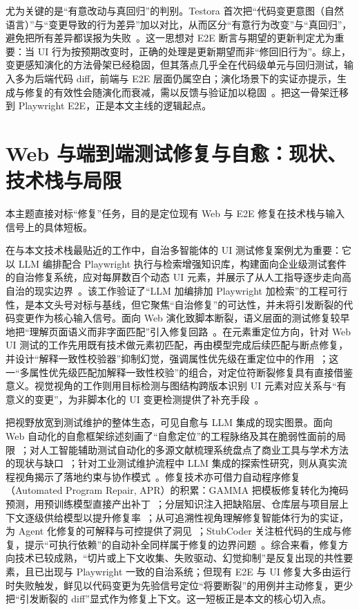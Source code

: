 \documentclass[11pt,a4paper]{article}
\begin{document}
尤为关键的是“有意改动与真回归”的判别。Testora 首次把“代码变更意图（自然语言）”与“变更导致的行为差异”加以对比，从而区分“有意行为改变”与“真回归”，避免把所有差异都误报为失败~\cite{testora}。这一思想对 E2E 断言与期望的更新判定尤为重要：当 UI 行为按预期改变时，正确的处理是更新期望而非“修回旧行为”。综上，变更感知演化的方法骨架已经稳固，但其落点几乎全在代码级单元与回归测试，输入多为后端代码 diff，前端与 E2E 层面仍属空白；演化场景下的实证亦提示，生成与修复的有效性会随演化而衰减，需以反馈与验证加以稳固~\cite{evalevolution}。把这一骨架迁移到 Playwright E2E，正是本文主线的逻辑起点。

\section{Web 与端到端测试修复与自愈：现状、技术栈与局限}

本主题直接对标“修复”任务，目的是定位现有 Web 与 E2E 修复在技术栈与输入信号上的具体短板。

在与本文技术栈最贴近的工作中，自治多智能体的 UI 测试修复案例尤为重要：它以 LLM 编排配合 Playwright 执行与检索增强知识库，构建面向企业级测试套件的自治修复系统，应对每屏数百个动态 UI 元素，并展示了从人工指导逐步走向高自治的现实边界~\cite{practicallimits}。该工作验证了“LLM 加编排加 Playwright 加检索”的工程可行性，是本文头号对标与基线，但它聚焦“自治修复”的可达性，并未将引发断裂的代码变更作为核心输入信号。面向 Web 演化致脚本断裂，语义层面的测试修复较早地把“理解页面语义而非字面匹配”引入修复回路~\cite{semantictestrepair}。在元素重定位方向，针对 Web UI 测试的工作先用既有技术做元素初匹配，再由模型完成后续匹配与断点修复，并设计“解释一致性校验器”抑制幻觉，强调属性优先级在重定位中的作用~\cite{fixwebui}；这一“多属性优先级匹配加解释一致性校验”的组合，对定位符断裂修复具有直接借鉴意义。视觉视角的工作则用目标检测与图结构跨版本识别 UI 元素对应关系与“有意义的变更”，为非脚本化的 UI 变更检测提供了补充手段~\cite{visualchange}。

把视野放宽到测试维护的整体生态，可见自愈与 LLM 集成的现实图景。面向 Web 自动化的自愈框架综述刻画了“自愈定位”的工程脉络及其在脆弱性面前的局限~\cite{selfhealingreview}；对人工智能辅助测试自动化的多源文献梳理系统盘点了商业工具与学术方法的现状与缺口~\cite{greyliterature}；针对工业测试维护流程中 LLM 集成的探索性研究，则从真实流程视角揭示了落地约束与协作模式~\cite{llmindustrialmaint}。修复技术亦可借力自动程序修复（Automated Program Repair, APR）的积累：GAMMA 把模板修复转化为掩码预测，用预训练模型直接产出补丁~\cite{gamma}；分层知识注入把缺陷层、仓库层与项目层上下文逐级供给模型以提升修复率~\cite{hierknowledge}；从可追溯性视角理解修复智能体行为的实证，为 Agent 化修复的可解释与可控提供了洞见~\cite{apragentstrace}；StubCoder 关注桩代码的生成与修复，提示“可执行依赖”的自动补全同样属于修复的边界问题~\cite{stubcoder}。综合来看，修复方向技术已较成熟，“切片或上下文收集、失败驱动、幻觉抑制”是反复出现的共性要素，且已出现与 Playwright 一致的自治系统；但现有 E2E 与 UI 修复大多由运行时失败触发，鲜见以代码变更为先验信号定位“将要断裂”的用例并主动修复，更少把“引发断裂的 diff”显式作为修复上下文。这一短板正是本文的核心切入点。
\end{document}
